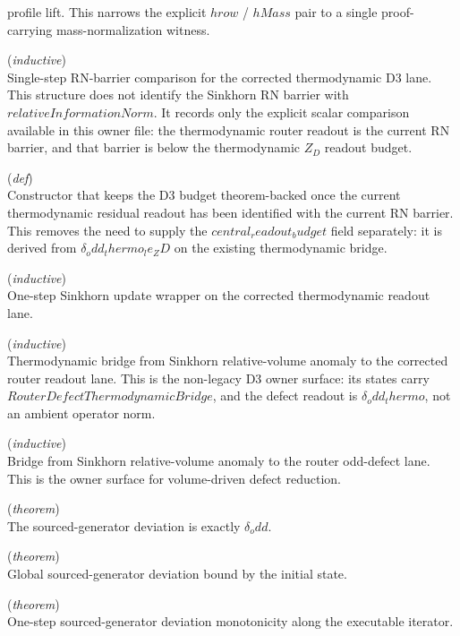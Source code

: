 \documentclass[11pt,a4paper]{article}
\begin{document}
\begin{description}
profile lift. 
This narrows the explicit $hrow$ / $hMass$ pair to a single proof-carrying 
mass-normalization witness.
  \item[\texttt{SinkhornRNBarrierThermodynamicComparison}] (\textit{inductive}) \\ Single-step RN-barrier comparison for the corrected thermodynamic D3 lane. 
This structure does not identify the Sinkhorn RN barrier with 
$relativeInformationNorm$. It records only the explicit scalar comparison 
available in this owner file: the thermodynamic router readout is the current 
RN barrier, and that barrier is below the thermodynamic $Z_D$ readout budget.
  \item[\texttt{ofResidualReadoutEqBarrier}] (\textit{def}) \\ Constructor that keeps the D3 budget theorem-backed once the current 
thermodynamic residual readout has been identified with the current RN barrier. 
This removes the need to supply the $central_readout_budget$ field separately: 
it is derived from $\delta _odd_thermo_le_ZD$ on the existing thermodynamic bridge.
  \item[\texttt{SinkhornThermodynamicDefectStep}] (\textit{inductive}) \\ One-step Sinkhorn update wrapper on the corrected thermodynamic readout lane.
  \item[\texttt{SinkhornThermodynamicRelativeDefectBridge}] (\textit{inductive}) \\ Thermodynamic bridge from Sinkhorn relative-volume anomaly to the corrected 
router readout lane. 
This is the non-legacy D3 owner surface: its states carry 
$RouterDefectThermodynamicBridge$, and the defect readout is 
$\delta _odd_thermo$, not an ambient operator norm.
  \item[\texttt{SinkhornVolumeAnomalyBridge}] (\textit{inductive}) \\ Bridge from Sinkhorn relative-volume anomaly to the router odd-defect lane. 
This is the owner surface for volume-driven defect reduction.
  \item[\texttt{sourcedGenerator\_deviation\_eq\_$\delta $\_odd}] (\textit{theorem}) \\ The sourced-generator deviation is exactly $\delta _odd$.
  \item[\texttt{sourcedGenerator\_deviation\_iterate\_le\_initial}] (\textit{theorem}) \\ Global sourced-generator deviation bound by the initial state.
  \item[\texttt{sourcedGenerator\_deviation\_iterate\_succ\_le\_iterate}] (\textit{theorem}) \\ One-step sourced-generator deviation monotonicity along the executable iterator.

\end{description}
\end{document}

